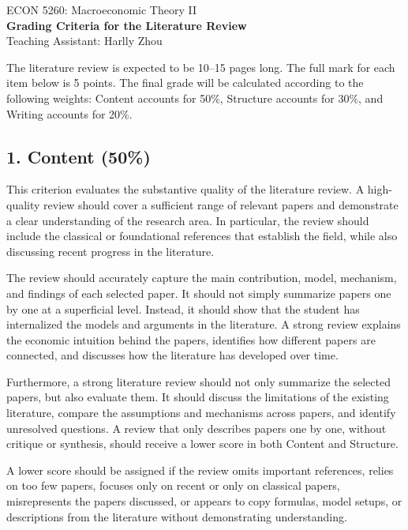 \documentclass[12pt]{article}
\begin{document}
\begin{center}
    ECON 5260: Macroeconomic Theory II\\
    {\large \textbf{Grading Criteria for the Literature Review}}\\
    Teaching Assistant: Harlly Zhou
\end{center}


The literature review is expected to be 10--15 pages long. The full mark for each item below is 5 points. The final grade will be calculated according to the following weights: Content accounts for 50\%, Structure accounts for 30\%, and Writing accounts for 20\%.

\subsection*{1. Content \texorpdfstring{(50\%)}{}}

This criterion evaluates the substantive quality of the literature review. A high-quality review should cover a sufficient range of relevant papers and demonstrate a clear understanding of the research area. In particular, the review should include the classical or foundational references that establish the field, while also discussing recent progress in the literature.

The review should accurately capture the main contribution, model, mechanism, and findings of each selected paper. It should not simply summarize papers one by one at a superficial level. Instead, it should show that the student has internalized the models and arguments in the literature. A strong review explains the economic intuition behind the papers, identifies how different papers are connected, and discusses how the literature has developed over time.

Furthermore, a strong literature review should not only summarize the selected papers, but also evaluate them. It should discuss the limitations of the existing literature, compare the assumptions and mechanisms across papers, and identify unresolved questions. A review that only describes papers one by one, without critique or synthesis, should receive a lower score in both Content and Structure.

A lower score should be assigned if the review omits important references, relies on too few papers, focuses only on recent or only on classical papers, misrepresents the papers discussed, or appears to copy formulas, model setups, or descriptions from the literature without demonstrating understanding.
\end{document}
